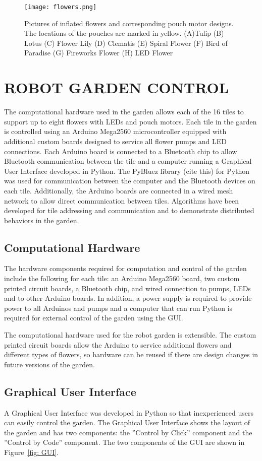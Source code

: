 \documentclass[letterpaper, 10 pt, conference]{ieeeconf}  %
\begin{document}
\begin{figure}[thpb]
	\centering
	\texttt{[image: flowers.png]}
	\caption{Pictures of inflated flowers and corresponding pouch motor designs. The locations of the pouches are marked in yellow. (A)Tulip (B) Lotus (C) Flower Lily (D) Clematis (E) Spiral Flower (F) Bird of Paradise (G) Fireworks Flower (H) LED Flower }
	\label{flowers}
\end{figure}

\section{ROBOT GARDEN CONTROL}
The computational hardware used in the garden allows each of the 16 tiles to support up to eight flowers with LEDs and pouch motors.  Each tile in the garden is controlled using an Arduino Mega2560 microcontroller equipped with additional custom boards designed to service all flower pumps and LED connections.  Each Arduino board is connected to a Bluetooth chip to allow Bluetooth communication between the tile and a computer running a Graphical User Interface developed in Python.  The PyBluez library (cite this) for Python was used for communication between the computer and the Bluetooth devices on each tile.  Additionally, the Arduino boards are connected in a wired mesh network to allow direct communication between tiles.  Algorithms have been developed for tile addressing and communication and to demonstrate distributed behaviors in the garden.


\subsection{\textbf{Computational Hardware}} 
The hardware components required for computation and control of the garden include the following for each tile: an Arduino Mega2560 board, two custom printed circuit boards, a Bluetooth chip, and wired connection to pumps, LEDs and to other Arduino boards.  In addition, a power supply is required to provide power to all Arduinos and pumps and a computer that can run Python is required for external control of the garden using the GUI.

The computational hardware used for the robot garden is extensible. The custom printed circuit boards allow the Arduino to service additional flowers and different types of flowers, so hardware can be reused if there are design changes in future versions of the garden.

\subsection{\textbf{Graphical User Interface}}
A Graphical User Interface was developed in Python so that inexperienced users can easily control the garden.  The Graphical User Interface shows the layout of the garden and has two components: the ''Control by Click'' component and the ''Control by Code'' component.  The two components of the GUI are shown in Figure~\ref{fig: GUI}.
\end{document}
